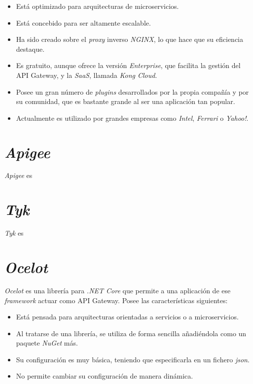\documentclass[11pt,spanish,listoffigures]{tfgetsinf}
\begin{document}
\begin{itemize}

	\item Está optimizado para arquitecturas de microservicios.
	\item Está concebido para ser altamente escalable.
	\item Ha sido creado sobre el \emph{proxy} inverso \emph{NGINX}, lo que hace que su eficiencia destaque.
	\item Es gratuito, aunque ofrece la versión \emph{Enterprise}, que facilita la gestión del API Gateway, y la \emph{SaaS}, llamada \emph{Kong Cloud}.
	\item Posee un gran número de \emph{plugins} desarrollados por la propia compañía y por su comunidad, que es bastante grande al ser una aplicación tan popular.
	\item Actualmente es utilizado por grandes empresas como \emph{Intel}, \emph{Ferrari} o \emph{Yahoo!}.

\end{itemize}

\section{\emph{Apigee}}
\emph{Apigee} \cite{Apigee} es

\section{\emph{Tyk}}
\emph{Tyk} \cite{Tyk} es

\section{\emph{Ocelot}}
\emph{Ocelot} \cite{Ocelot} es una librería para \emph{.NET Core} que permite a una aplicación de ese \emph{framework} actuar como API Gateway. Posee las características siguientes:

\begin{itemize}

	\item Está pensada para arquitecturas orientadas a servicios o a microservicios.
	\item Al tratarse de una librería, se utiliza de forma sencilla añadiéndola como un paquete \emph{NuGet} más.
	\item Su configuración es muy básica, teniendo que especificarla en un fichero \emph{json}.
	\item No permite cambiar su configuración de manera dinámica.

\end{itemize}
\end{document}
